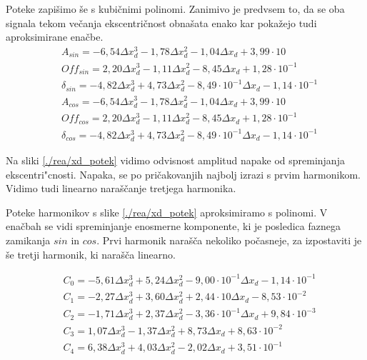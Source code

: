 Poteke zapišimo še s kubičnimi polinomi. Zanimivo je predvsem to, da se oba signala tekom večanja ekscentričnost obnašata enako kar pokažejo tudi aproksimirane enačbe.
\begin{eqnarray}
&A_{sin} = -6,54\Delta x_d^3-1,78\Delta x_d^2-1,04\Delta x_d+3,99\cdot 10\\     
&Off_{sin} = 2,20\Delta x_d^3-1,11\Delta x_d^2-8,45\Delta x_d+1,28\cdot 10^{-1}\\   
&\delta_{sin} = -4,82\Delta x_d^3+4,73\Delta x_d^2-8,49\cdot 10^{-1}\Delta x_d-1,14\cdot 10^{-1}\\
&A_{cos} = -6,54\Delta x_d^3-1,78\Delta x_d^2-1,04\Delta x_d+3,99\cdot 10\\     
&Off_{cos} = 2,20\Delta x_d^3-1,11\Delta x_d^2-8,45\Delta x_d+1,28\cdot 10^{-1}\\   
&\delta_{cos} = -4,82\Delta x_d^3+4,73\Delta x_d^2-8,49\cdot 10^{-1}\Delta x_d-1,14\cdot 10^{-1}
\end{eqnarray}

Na sliki \ref{./rea/xd_potek} vidimo odvisnost amplitud napake od spreminjanja ekscentri"cnosti. Napaka, se po pričakovanjih najbolj izrazi s prvim harmonikom. Vidimo tudi linearno naraščanje tretjega harmonika.


Poteke harmonikov s slike \ref{./rea/xd_potek} aproksimiramo  s polinomi. V enačbah se vidi spreminjanje enosmerne komponente, ki je posledica faznega zamikanja $sin$ in $cos$. Prvi harmonik narašča nekoliko počasneje, za izpostaviti je še tretji harmonik, ki narašča linearno.

\begin{eqnarray}
&C_0 =-5,61\Delta x_d^{3}+5,24\Delta x_d^{2}-9,00\cdot 10^{-1}\Delta x_d-1,14\cdot 10^{-1} \\
&C_1 =-2,27\Delta x_d^{3}+3,60\Delta x_d^{2}+2,44\cdot 10\Delta x_d-8,53\cdot 10^{-2} \\     
&C_2 =-1,71\Delta x_d^{3}+2,37\Delta x_d^{2}-3,36\cdot 10^{-1}\Delta x_d+9,84\cdot 10^{-3} \\
&C_3 =1,07\Delta x_d^{3}-1,37\Delta x_d^{2}+8,73\Delta x_d+8,63\cdot 10^{-2} \\              
&C_4 =6,38\Delta x_d^{3}+4,03\Delta x_d^{2}-2,02\Delta x_d+3,51\cdot 10^{-1}       
\end{eqnarray}





